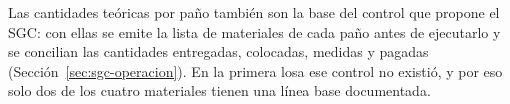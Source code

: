 Las cantidades teóricas por paño también son la base del control que propone el SGC: con ellas se emite la lista de materiales de cada paño antes de ejecutarlo y se concilian las cantidades entregadas, colocadas, medidas y pagadas (Sección~\ref{sec:sgc-operacion}). En la primera losa ese control no existió, y por eso solo dos de los cuatro materiales tienen una línea base documentada. 

